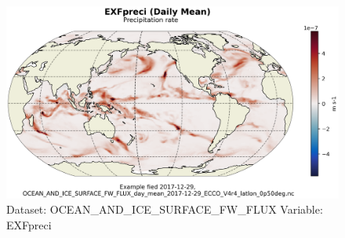 \begin{figure}[H]
\centering
\includegraphics[scale=0.55]{../images/plots/latlon_plots/Ocean_and_Sea-Ice_Surface_Freshwater_Fluxes/EXFpreci.png}
\caption{Dataset: OCEAN\_AND\_ICE\_SURFACE\_FW\_FLUX Variable: EXFpreci}
\label{tab:table-OCEAN_AND_ICE_SURFACE_FW_FLUX_EXFpreci-Plot}
\end{figure}
\pagebreak

